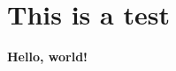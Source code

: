\documentclass[../main.tex]{subfiles}
\begin{document}
    
\chapter{This is a test}
    
\textbf{Hello, world!}
\end{document}
